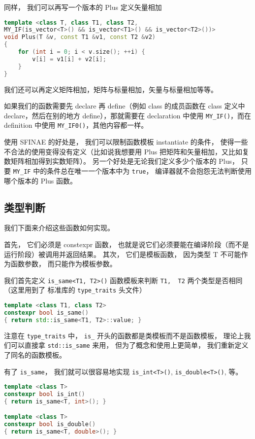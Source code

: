 同样， 我们可以再写一个版本的 Plus 定义矢量相加
\begin{lstlisting}[language=cpp]
template <class T, class T1, class T2,
MY_IF(is_vector<T>() && is_vector<T1>() && is_vector<T2>())>
void Plus(T &v, const T1 &v1, const T2 &v2)
{
    for (int i = 0; i < v.size(); ++i) {
        v[i] = v1[i] + v2[i];
    }
}
\end{lstlisting}

我们还可以再定义矩阵相加，矩阵与标量相加，矢量与标量相加等等。

如果我们的函数需要先 declare 再 define（例如 class 的成员函数在 class 定义中 declare，然后在别的地方 define），那就需要在 declaration 中使用 \verb`MY_IF()`，而在 definition 中使用 \verb`MY_IF0()`，其他内容都一样。

使用 SFINAE 的好处是， 我们可以限制函数模板 instantiate 的条件， 使得一些不合法的使用变得没有定义（比如说我想要用 Plus 把矩阵和矢量相加，又比如复数矩阵相加得到实数矩阵）。 另一个好处是无论我们定义多少个版本的 Plus， 只要 \verb`MY_IF` 中的条件总在唯一一个版本中为 \verb`true`， 编译器就不会抱怨无法判断使用哪个版本的 Plus 函数。

\subsection{类型判断}
我们下面来介绍这些函数如何实现。

首先， 它们必须是 constexpr 函数， 也就是说它们必须要能在编译阶段（而不是运行阶段）被调用并返回结果。 其次， 它们是模板函数， 因为类型 T 不可能作为函数参数， 而只能作为模板参数。

我们首先定义 \verb`is_same<T1, T2>()` 函数模板来判断 \verb`T1,  T2` 两个类型是否相同（这里用到了 标准库的 \verb`type_traits` 头文件）
\begin{lstlisting}[language=cpp]
template <class T1, class T2>
constexpr bool is_same()
{ return std::is_same<T1, T2>::value; }
\end{lstlisting}

注意在 \verb`type_traits` 中， \verb`is_` 开头的函数都是类模板而不是函数模板， 理论上我们可以直接拿 \verb`std::is_same` 来用， 但为了概念和使用上更简单， 我们重新定义了同名的函数模板。

有了 \verb`is_same`， 我们就可以很容易地实现 \verb`is_int<T>()`, \verb`is_double<T>()`, 等。
\begin{lstlisting}[language=cpp]
template <class T>
constexpr bool is_int()
{ return is_same<T, int>(); }

template <class T>
constexpr bool is_double()
{ return is_same<T, double>(); }
\end{lstlisting}

